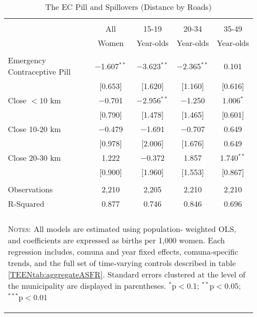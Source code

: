 \begin{table}[!htbp] \centering
\caption{The EC Pill and Spillovers (Distance by Roads)}
\label{TEENtab:SpilloverRoad} \begin{tabular}
{@{\extracolsep{5pt}}lcccc}\\[-1.8ex]\hline\hline\\
[-1.8ex] & All & 15-19 & 20-34 & 35-49 \\
& Women & Year-olds & Year-olds & Year-olds \\ \midrule
& & & & \\
Emergency Contraceptive Pill &$-$1.607$^{**}$&$-$3.623$^{**}$&$-$2.365$^{**}$&0.101\\
&[0.653]&[1.620]&[1.160]&[0.616]\\
Close $<10$ km &$-$0.701&$-$2.956$^{**}$&$-$1.250&1.006$^{*}$\\
&[0.790]&[1.478]&[1.465]&[0.601]\\
Close 10-20 km &$-$0.479&$-$1.691&$-$0.707&0.649\\
&[0.978]&[2.006]&[1.676]&0.649\\
Close 20-30 km & 1.222&$-$0.372& 1.857&1.740$^{**}$\\
&[0.900]&[1.960]&[1.553]&[0.867]\\
& & & & \\
Observations&2,210&2,205&2,210&2,210\\
R-Squared&0.877&0.746&0.846&0.696\\
\hline \hline \\[-1.8ex]
\multicolumn{5}{p{12.8cm}}{\begin{footnotesize}          
\textsc{Notes:} All models are estimated using population-
weighted OLS, and coefficients are expressed as births per 
1,000 women.  Each regression includes, comuna and year    
fixed effects, comuna-specific trends, and the full set of 
time-varying controls described in table                   
\ref{TEENtab:aggregateASFR}. Standard errors              
clustered at the level of the municipality are displayed in
parentheses.
$^{*}$p$<$0.1; $^{**}$p$<$0.05; $^{***}$p$<$0.01\end{footnotesize}}
\normalsize\end{tabular}\end{table}
